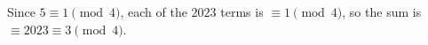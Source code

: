 Since $5\equiv1\pmod4$, each of the $2023$ terms is $\equiv1\pmod4$, so the sum is $\equiv2023\equiv\boxed{3}\pmod4$.
